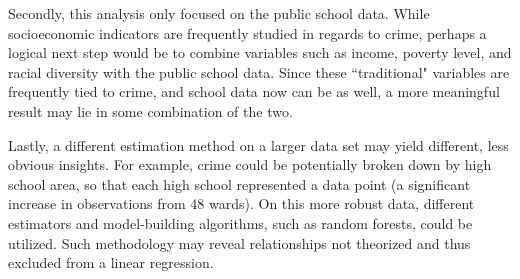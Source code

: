 \documentclass[12pt]{article}
\begin{document}
\par

Secondly, this analysis only focused on the public school data.  While socioeconomic indicators are frequently studied in regards to crime, perhaps a logical next step would be to combine variables such as income, poverty level, and racial diversity with the public school data.  Since these ``traditional" variables are frequently tied to crime, and school data now can be as well, a more meaningful result may lie in some combination of the two.

\par

Lastly, a different estimation method on a larger data set may yield different, less obvious insights.  For example, crime could be potentially broken down by high school area, so that each high school represented a data point (a significant increase in observations from 48 wards).  On this more robust data, different estimators and model-building algorithms, such as random forests, could be utilized.  Such methodology may reveal relationships not theorized and thus excluded from a linear regression.





\newpage
\end{document}

